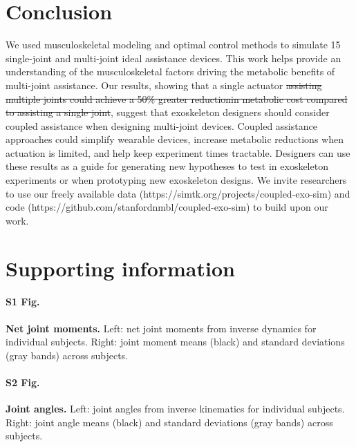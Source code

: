 \documentclass[10pt,letterpaper]{article}
\providecommand{\DIFaddtex}[1]{{\protect\color{blue}{#1}}} %
\providecommand{\DIFdeltex}[1]{{\protect\color{red}\sout{#1}}}                      %
\providecommand{\DIFaddbegin}{} %
\providecommand{\DIFaddend}{} %
\providecommand{\DIFdelbegin}{} %
\providecommand{\DIFdelend}{} %
\providecommand{\DIFadd}[1]{\texorpdfstring{\DIFaddtex{#1}}{#1}} %
\providecommand{\DIFdel}[1]{\texorpdfstring{\DIFdeltex{#1}}{}} %
\newcommand{\DIFscaledelfig}{0.5}
\newlength{\DIFdelgraphicswidth} %
\newlength{\DIFdelgraphicsheight} %
\newcommand{\DIFaddincludegraphics}[2][]{{\color{blue}\fbox{\DIFOincludegraphics[#1]{#2}}}} %
\newcommand{\DIFdelincludegraphics}[2][]{%
\sbox{\DIFdelgraphicsbox}{\DIFOincludegraphics[#1]{#2}}%
\settoboxwidth{\DIFdelgraphicswidth}{\DIFdelgraphicsbox} %
\settoboxtotalheight{\DIFdelgraphicsheight}{\DIFdelgraphicsbox} %
\scalebox{\DIFscaledelfig}{%
\parbox[b]{\DIFdelgraphicswidth}{\usebox{\DIFdelgraphicsbox}\\[-\baselineskip] \rule{\DIFdelgraphicswidth}{0em}}\llap{\resizebox{\DIFdelgraphicswidth}{\DIFdelgraphicsheight}{%
\setlength{\unitlength}{\DIFdelgraphicswidth}%
\begin{picture}(1,1)%
\thicklines\linethickness{2pt} %
{\color[rgb]{1,0,0}\put(0,0){\framebox(1,1){}}}%
{\color[rgb]{1,0,0}\put(0,0){\line( 1,1){1}}}%
{\color[rgb]{1,0,0}\put(0,1){\line(1,-1){1}}}%
\end{picture}%
}*{3pt}}} %
} %
\DeclareRobustCommand{\DIFaddbegin}{\DIFOaddbegin \let\includegraphics\DIFaddincludegraphics} %
\DeclareRobustCommand{\DIFaddend}{\DIFOaddend \let\includegraphics\DIFOincludegraphics} %
\DeclareRobustCommand{\DIFdelbegin}{\DIFOdelbegin \let\includegraphics\DIFdelincludegraphics} %
\DeclareRobustCommand{\DIFdelend}{\DIFOaddend \let\includegraphics\DIFOincludegraphics} %
\begin{document}
\section*{Conclusion}
We used musculoskeletal modeling and optimal control methods to simulate 15 single-joint and multi-joint ideal assistance devices. This work helps provide an understanding of the musculoskeletal factors driving the metabolic benefits of multi-joint assistance. Our results, showing that \DIFaddbegin \DIFadd{the greatest reduction in metabolic cost using }\DIFaddend a single actuator \DIFdelbegin \DIFdel{assisting multiple joints could achieve a 50\% greater reductionin metabolic cost compared to assisting a single joint}\DIFdelend \DIFaddbegin \DIFadd{to assist multiple joints (39\% reduction) was significantly larger than the reduction produced by the best single-joint device (22\% reduction)}\DIFaddend , suggest that exoskeleton designers should consider coupled assistance when designing multi-joint devices. Coupled assistance approaches could simplify wearable devices, increase metabolic reductions when actuation is limited, and help keep experiment times tractable. Designers can use these results as a guide for generating new hypotheses to test in exoskeleton experiments or when prototyping new exoskeleton designs. We invite researchers to use our freely available data (https://simtk.org/projects/coupled-exo-sim) and code (https://github.com/stanfordnmbl/coupled-exo-sim) to build upon our work.

\section*{Supporting information}

\paragraph*{S1 Fig.}
\label{S1_Fig}
{\bf Net joint moments.} Left: net joint moments from inverse dynamics for individual subjects. Right: joint moment means (black) and standard deviations (gray bands) across subjects.

\paragraph*{S2 Fig.}
\label{S2_Fig}
{\bf Joint angles.} Left: joint angles from inverse kinematics for individual subjects. Right: joint angle means (black) and standard deviations (gray bands) across subjects.
\end{document}
